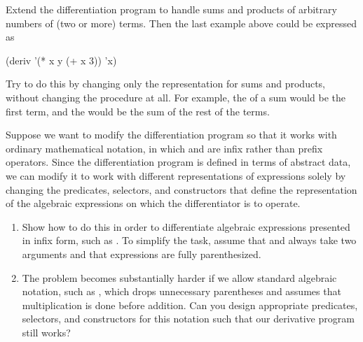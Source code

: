 \begin{exercise}
	\label{Exercise 2.57}
	Extend the differentiation program to handle sums and products of arbitrary numbers of (two or more) terms.
	Then the last example above could be expressed as
	\begin{scheme}
	  (deriv '(* x y (+ x 3)) 'x)
	\end{scheme}
	Try to do this by changing only the representation for sums and products, without changing the  procedure at all.
	For example, the  of a sum would be the first term, and the  would be the sum of the rest of the terms.
\end{exercise}



\begin{exercise}
	\label{Exercise 2.58}
	Suppose we want to modify the differentiation program so that it works with ordinary mathematical notation, in which \code{+} and \code{*} are infix rather than prefix operators.
	Since the differentiation program is defined in terms of abstract data, we can modify it to work with different representations of expressions solely by changing the predicates, selectors, and constructors that define the representation of the algebraic expressions on which the differentiator is to operate.
	\begin{enumerate}[label = \alph*., leftmargin = *]

		\item
			Show how to do this in order to differentiate algebraic expressions presented in infix form, such as .
			To simplify the task, assume that \code{+} and \code{*} always take two arguments and that expressions are fully parenthesized.

		\item
			The problem becomes substantially harder if we allow standard algebraic notation, such as , which drops unnecessary parentheses and assumes that multiplication is done before addition.
			Can you design appropriate predicates, selectors, and constructors for this notation such that our derivative program still works?

	\end{enumerate}
\end{exercise}
